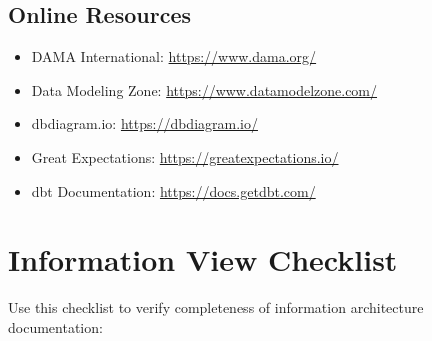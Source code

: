 \documentclass[11pt,letterpaper]{article}
\begin{document}
\subsection{Online Resources}

\begin{itemize}
    \item DAMA International: \url{https://www.dama.org/}
    \item Data Modeling Zone: \url{https://www.datamodelzone.com/}
    \item dbdiagram.io: \url{https://dbdiagram.io/}
    \item Great Expectations: \url{https://greatexpectations.io/}
    \item dbt Documentation: \url{https://docs.getdbt.com/}
\end{itemize}

\appendix

\section{Information View Checklist}

Use this checklist to verify completeness of information architecture documentation:
\end{document}
